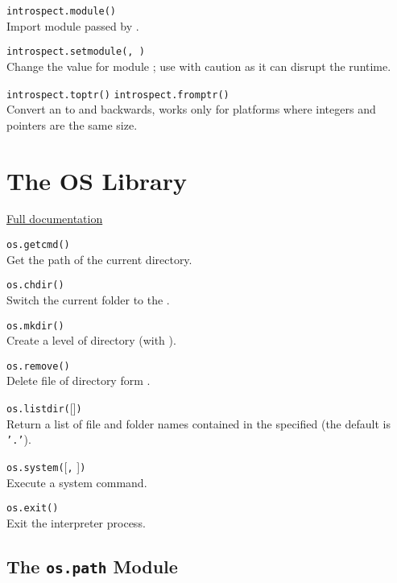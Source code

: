 \hangpar \texttt{introspect.module(}\texttt{)} \\
Import module passed by .

\hangpar \texttt{introspect.setmodule(}\texttt{, }\texttt{)} \\
Change the value for module ; use with caution as it can disrupt the runtime.

\hangpar \texttt{introspect.toptr(}\texttt{)}  \texttt{introspect.fromptr(}\texttt{)} \\
Convert an  to  and backwards, works only for platforms where integers and pointers are the same size.

\section*{The OS Library}

\hangpar \href{https://github.com/berry-lang/berry/wiki/Chapter-7\#module-os}{Full documentation}

\hangpar \texttt{os.getcmd()} \\
Get the path of the current directory.

\hangpar \texttt{os.chdir(}\texttt{)} \\
Switch the current folder to the .

\hangpar \texttt{os.mkdir(}\texttt{)} \\
Create a level of directory (with ).

\hangpar \texttt{os.remove(}\texttt{)} \\
Delete file of directory form .

\hangpar \texttt{os.listdir(}[]\texttt{)} \\
Return a list of file and folder names contained in the specified  (the default is \texttt{'.'}).

\hangpar \texttt{os.system(}[\texttt{,} ]\texttt{)} \\
Execute a system command.

\hangpar \texttt{os.exit()}\\
Exit the interpreter process.

\subsection*{The \texttt{os.path} Module}

